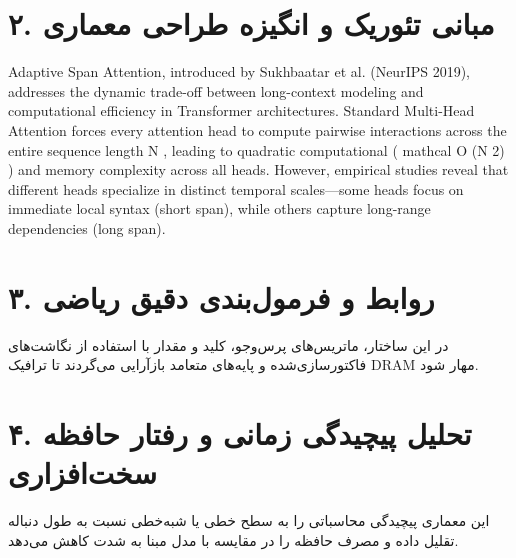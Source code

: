 \documentclass[12pt,a4paper]{article}
\begin{document}
\section*{۲. مبانی تئوریک و انگیزه طراحی معماری}
Adaptive Span Attention, introduced by Sukhbaatar et al. (NeurIPS 2019), addresses the dynamic trade-off between long-context modeling and computational efficiency in Transformer architectures. Standard Multi-Head Attention forces every attention head to compute pairwise interactions across the entire sequence length N , leading to quadratic computational ( mathcal O (N 2) ) and memory complexity across all heads. However, empirical studies reveal that different heads specialize in distinct temporal scales—some heads focus on immediate local syntax (short span), while others capture long-range dependencies (long span).

\section*{۳. روابط و فرمول‌بندی دقیق ریاضی}
در این ساختار، ماتریس‌های پرس‌وجو، کلید و مقدار با استفاده از نگاشت‌های فاکتورسازی‌شده و پایه‌های متعامد بازآرایی می‌گردند تا ترافیک DRAM مهار شود.

\section*{۴. تحلیل پیچیدگی زمانی و رفتار حافظه سخت‌افزاری}
این معماری پیچیدگی محاسباتی را به سطح خطی یا شبه‌خطی نسبت به طول دنباله تقلیل داده و مصرف حافظه را در مقایسه با مدل مبنا به شدت کاهش می‌دهد.
\end{document}

